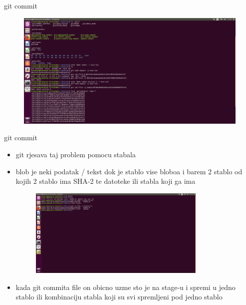 \documentclass[]{beamer}
\begin{document}
\begin{frame}{git commit}
\begin{figure}
\centering
\includegraphics[width=1\textwidth]{./slike/druga_slika.jpg}
\end{figure}

\end{frame}

\begin{frame}{git commit}

\begin{itemize}
	\item git rjesava taj problem pomocu stabala
	\item blob je neki podatak / tekst dok je stablo vise bloboa i barem 2 stablo od kojih 2 stablo ima SHA-2 te datoteke ili stabla koji ga ima
	\begin{figure}
		\centering
	\includegraphics[width=0.8\textwidth]{./slike/treca_slika.jpg}
	\end{figure}
	\item kada git commita file on obicno uzme sto je na stage-u i spremi u jedno stablo ili kombinaciju stabla koji su svi spremljeni pod jedno stablo
\end{itemize}
\end{frame}
\end{document}
